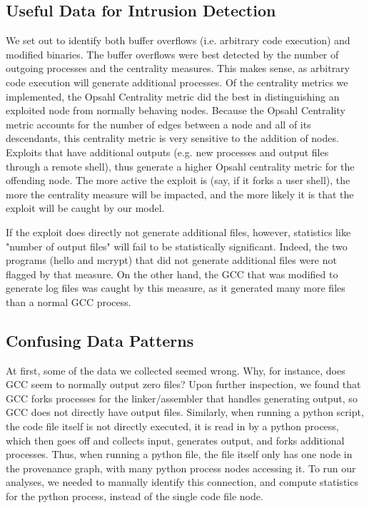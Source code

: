 \documentclass[10pt,twocolumn]{article}
\begin{document}
\subsection{Useful Data for Intrusion Detection}
We set out to identify both buffer overflows (i.e. arbitrary code execution) and modified binaries. The buffer overflows were best detected by the number of outgoing processes and the centrality measures. This makes sense, as arbitrary code execution will generate additional processes. Of the centrality metrics we implemented, the Opsahl Centrality metric did the best in distinguishing an exploited node from normally behaving nodes. Because the Opsahl Centrality metric accounts for the number of edges between a node and all of its descendants, this centrality metric is very sensitive to the addition of nodes. Exploits that have additional outputs (e.g. new processes and output files through a remote shell), thus generate a higher Opsahl centrality metric for the offending node. The more active the exploit is (say, if it forks a user shell), the more the centrality measure will be impacted, and the more likely it is that the exploit will be caught by our model.

If the exploit does directly not generate additional files, however, statistics like "number of output files" will fail to be statistically significant. Indeed, the two programs (hello and mcrypt) that did not generate additional files were not flagged by that measure. On the other hand, the GCC that was modified to generate log files was caught by this measure, as it generated many more files than a normal GCC process. 

\subsection{Confusing Data Patterns}
At first, some of the data we collected seemed wrong. Why, for instance, does GCC seem to normally output zero files? Upon further inspection, we found that GCC forks processes for the linker/assembler that handles generating output, so GCC does not directly have output files. Similarly, when running a python script, the code file itself is not directly executed, it is read in by a python process, which then goes off and collects input, generates output, and forks additional processes. Thus, when running a python file, the file itself only has one node in the provenance graph, with many python process nodes accessing it. To run our analyses, we needed to manually identify this connection, and compute statistics for the python process, instead of the single code file node.
\end{document}
